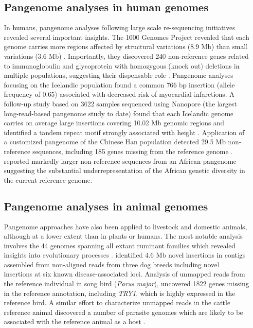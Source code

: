 \documentclass[../main.tex]{subfiles}
\begin{document}
\subsection*{Pangenome analyses in human genomes}
In humans, pangenome analyses following large scale re-sequencing initiatives revealed several important insights. The 1000 Genomes Project revealed that each genome carries more regions affected by structural variations (8.9 Mb) than small variations (3.6 Mb) \citep{10002015global}. Importantly, they discovered 240 non-reference genes related to immunoglobulin and glycoprotein with homozygous (knock out) deletions in multiple populations, suggesting their dispensable role \citep{sudmant2015integrated}. Pangenome analyses focusing on the Icelandic population \citep{kehr2017diversity} found a common 766 bp insertion (allele frequency of 0.65) associated with decreased risk of myocardial infarctions. A follow-up study based on 3622 samples sequenced using Nanopore (the largest long-read-based pangenome study to date) found that each Icelandic genome carries on average large insertions covering 10.02 Mb genomic regions and identified a tandem repeat motif strongly associated with height \citep{Beyter2021ng}. Application of a customized pangenome of the Chinese Han population detected 29.5 Mb non-reference sequences, including 185 genes missing from the reference genome \citep{duan2019hupan}. \citet{sherman2019assembly} reported markedly larger non-reference sequences from an African pangenome suggesting the substantial underrepresentation of the African genetic diversity in the current reference genome.

\subsection*{Pangenome analyses in animal genomes}
Pangenome approaches have also been applied to livestock and domestic animals, although at a lower extent than in plants or humans. The most notable analysis involves the 44 genomes spanning all extant ruminant families which revealed insights into evolutionary processes \citep{chen2019large}. \citet{holden2018assembly} identified 4.6 Mb novel insertions in contigs assembled from non-aligned reads from three dog breeds including  novel insertions at six known disease-associated loci. Analysis of unmapped reads from the reference individual in song bird (\emph{Parus major}), \citet{laine2019exploring} uncovered 1822 genes missing in the reference annotation, including \emph{TRY1}, which is highly expressed in the reference bird. A similar effort to characterize unmapped reads in the cattle reference animal discovered a number of parasite genomes which are likely to be associated with the reference animal as a host \citep{whitacre2015s}. 
\end{document}
